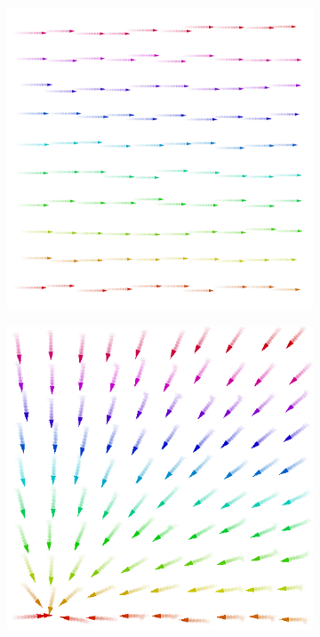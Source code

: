 \begin{figure}[t]
\centering
\begin{subfigure}{0.32\textwidth}
  \centering
  {\includegraphics[width=\textwidth]{papers/coordination2023-macro/images/constant.png}}
  \caption{}
  \label{fig:constant}
\end{subfigure}
\hfill
\begin{subfigure}{0.32\textwidth}
  \centering
  {\includegraphics[width=\textwidth]{papers/coordination2023-macro/images/towards-leader.png}}

\end{subfigure}
\end{figure}
